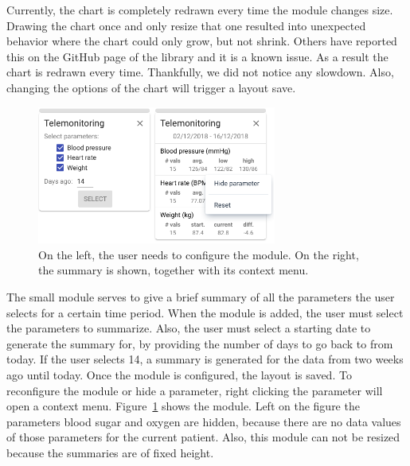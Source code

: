             Currently, the chart is completely redrawn every time the module changes size. Drawing the chart once and only resize that one resulted into unexpected behavior where the chart could only grow, but not shrink. Others have reported this on the GitHub page of the library and it is a known issue. As a result the chart is redrawn every time. Thankfully, we did not notice any slowdown. Also, changing the options of the chart will trigger a layout save.

            \begin{figure}[t]
                \centering
                \includegraphics[width=0.7\textwidth]{chapters/4_implementation/tm-small}
                \caption{On the left, the user needs to configure the module. On the right, the summary is shown, together with its context menu.}\label{fig:tm-small}
            \end{figure}

            The small module serves to give a brief summary of all the parameters the user selects for a certain time period. When the module is added, the user must select the parameters to summarize. Also, the user must select a starting date to generate the summary for, by providing the number of days to go back to from today. If the user selects 14, a summary is generated for the data from two weeks ago until today. Once  the module is configured, the layout is saved. To reconfigure the module or hide a parameter, right clicking the parameter will open a context menu. Figure~\ref{fig:tm-small} shows the module. Left on the figure the parameters blood sugar and oxygen are hidden, because there are no data values of those parameters for the current patient. Also, this module can not be resized because the summaries are of fixed height.
